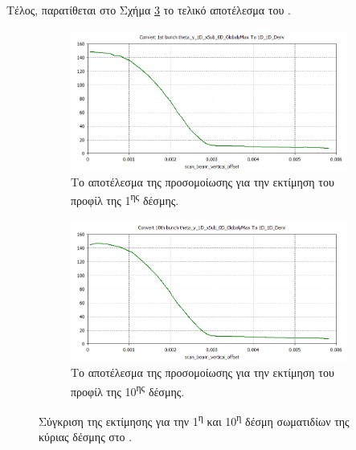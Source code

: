 Τέλος, παρατίθεται στο Σχήμα \ref{fig:CST-EBS-implementation} το τελικό αποτέλεσμα του . 

\begin{figure}[tph]	
	\centering
	\begin{subfigure}{\textwidth}
		\includegraphics[width=\linewidth]{figures/CST-EBS-implementation/CST-EBS-1st-bunch-thetay}
		\centering
		\caption{Το αποτέλεσμα της προσομοίωσης για την εκτίμηση του προφίλ της 1\textsuperscript{ης} δέσμης.}
		\label{fig:CST-EBS-1st-bunch-thetay}
	\end{subfigure}
	\hfill
	\begin{subfigure}{\textwidth}
		\includegraphics[width=\linewidth]{figures/CST-EBS-implementation/CST-EBS-10th-bunch-thetay}
		\centering
		\caption{Το αποτέλεσμα της προσομοίωσης για την εκτίμηση του προφίλ της 10\textsuperscript{ης} δέσμης.}
		\label{fig:CST-EBS-10th-bunch-thetay}
	\end{subfigure}
	\caption{Σύγκριση της εκτίμησης για την 1\textsuperscript{η} και 10\textsuperscript{η} δέσμη σωματιδίων της κύριας δέσμης στο .}
	\label{fig:CST-EBS-implementation}
\end{figure}

